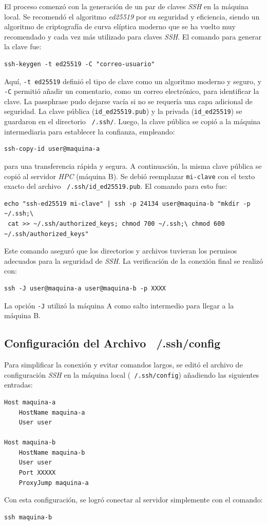 El proceso comenzó con la generación de un par de claves \textit{SSH} en la máquina local. Se recomendó el algoritmo \textit{ed25519} \cite{ref56} por su seguridad y eficiencia, siendo un algoritmo de criptografía de curva elíptica moderno que se ha vuelto muy recomendado y cada vez más utilizado para claves \textit{SSH}. El comando para generar la clave fue:
\begin{verbatim}
ssh-keygen -t ed25519 -C "correo-usuario"
\end{verbatim}

Aquí, \texttt{-t ed25519} definió el tipo de clave como un algoritmo moderno y seguro, y \texttt{-C} permitió añadir un comentario, como un correo electrónico, para identificar la clave. La passphrase pudo dejarse vacía si no se requería una capa adicional de seguridad. La clave pública (\texttt{id\_ed25519.pub}) y la privada (\texttt{id\_ed25519}) se guardaron en el directorio \texttt{~/.ssh/}.
Luego, la clave pública se copió a la máquina intermediaria para establecer la confianza, empleando:
\begin{verbatim}
ssh-copy-id user@maquina-a
\end{verbatim}
para una transferencia rápida y segura. A continuación, la misma clave pública se copió al servidor \textit{HPC} (máquina B). Se debió reemplazar \texttt{mi-clave} con el texto exacto del archivo \texttt{~/.ssh/id\_ed25519.pub}. El comando para esto fue:
\begin{verbatim}
echo "ssh-ed25519 mi-clave" | ssh -p 24134 user@maquina-b "mkdir -p ~/.ssh;\
 cat >> ~/.ssh/authorized_keys; chmod 700 ~/.ssh;\ chmod 600 ~/.ssh/authorized_keys"
\end{verbatim}

Este comando aseguró que los directorios y archivos tuvieran los permisos adecuados para la seguridad de \textit{SSH}.
La verificación de la conexión final se realizó con:
\begin{verbatim}
ssh -J user@maquina-a user@maquina-b -p XXXX
\end{verbatim}

La opción \texttt{-J} utilizó la máquina A como salto intermedio para llegar a la máquina B.

\subsection*{Configuración del Archivo ~/.ssh/config}
Para simplificar la conexión y evitar comandos largos, se editó el archivo de configuración \textit{SSH} en la máquina local (\texttt{~/.ssh/config}) añadiendo las siguientes entradas:
\begin{verbatim}
Host maquina-a
    HostName maquina-a
    User user

Host maquina-b
    HostName maquina-b
    User user
    Port XXXXX
    ProxyJump maquina-a
\end{verbatim}
Con esta configuración, se logró conectar al servidor simplemente con el comando:
\begin{verbatim}
ssh maquina-b
\end{verbatim}

